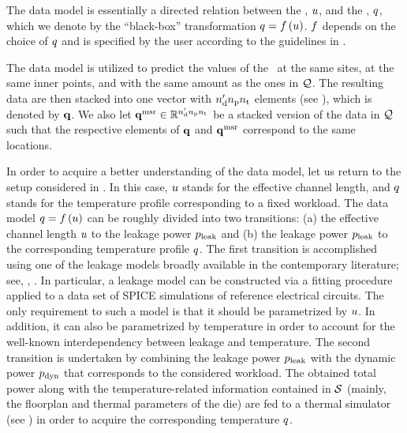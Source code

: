The data model is essentially a directed relation between the \qoi, $u$, and the \qom, $q$, which we denote by the ``black-box'' transformation $\q = \oBB{\u}$.
$\oBB$ depends on the choice of $q$ and is specified by the user according to the guidelines in .

The data model is utilized to predict the values of the \qom\ at the same sites, at the same inner points, and with the same amount as the ones in $\mathcal{Q}$.
The resulting data are then stacked into one vector with ${n_\text{d}'} {n_\text{p}} {n_\text{t}}$ elements (see ), which is denoted by $\mathbf{q}$.
We also let $\mathbf{q}^{\text{msr}} \in \mathbb{R}^{{n_\text{d}'} {n_\text{p}} {n_\text{t}}}$ be a stacked version of the data in $\mathcal{Q}$ such that the respective elements of $\mathbf{q}$ and $\mathbf{q}^{\text{msr}}$ correspond to the same locations.

In order to acquire a better understanding of the data model, let us return to the setup considered in .
In this case, $u$ stands for the effective channel length, and $q$ stands for the temperature profile corresponding to a fixed workload.
The data model $\q = \oBB{\u}$ can be roughly divided into two transitions: (a) the effective channel length $u$ to the leakage power $p_{\text{leak}}$ and (b) the leakage power $p_{\text{leak}}$ to the corresponding temperature profile $q$.
The first transition is accomplished using one of the leakage models broadly available in the contemporary literature; see, \eg, \cite{chandrakasan2001, srivastava2010, juan2012}.
In particular, a leakage model can be constructed via a fitting procedure applied to a data set of SPICE simulations of reference electrical circuits.
The only requirement to such a model is that it should be parametrized by $u$.
In addition, it can also be parametrized by temperature in order to account for the well-known interdependency between leakage and temperature.
The second transition is undertaken by combining the leakage power $p_{\text{leak}}$ with the dynamic power $p_{\text{dyn}}$ that corresponds to the considered workload.
The obtained total power along with the temperature-related information contained in $\mathcal{S}$ (mainly, the floorplan and thermal parameters of the die) are fed to a thermal simulator (see ) in order to acquire the corresponding temperature $q$.
